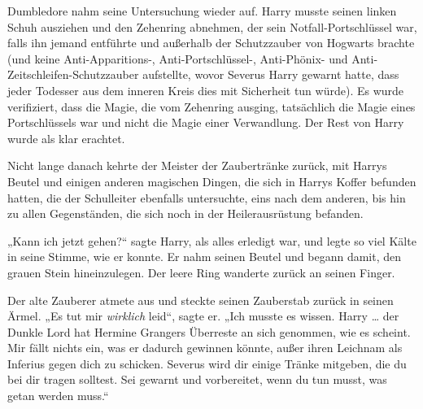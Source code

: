 Dumbledore nahm seine Untersuchung wieder auf. Harry musste seinen linken Schuh ausziehen und den Zehenring abnehmen, der sein Notfall-Portschlüssel war, falls ihn jemand entführte und außerhalb der Schutzzauber von Hogwarts brachte (und keine Anti-Apparitions-, Anti-Portschlüssel-, Anti-Phönix- und Anti-Zeitschleifen-Schutzzauber aufstellte, wovor Severus Harry gewarnt hatte, dass jeder Todesser aus dem inneren Kreis dies mit Sicherheit tun würde). Es wurde verifiziert, dass die Magie, die vom Zehenring ausging, tatsächlich die Magie eines Portschlüssels war und nicht die Magie einer Verwandlung. Der Rest von Harry wurde als klar erachtet.

Nicht lange danach kehrte der Meister der Zaubertränke zurück, mit Harrys Beutel und einigen anderen magischen Dingen, die sich in Harrys Koffer befunden hatten, die der Schulleiter ebenfalls untersuchte, eins nach dem anderen, bis hin zu allen Gegenständen, die sich noch in der Heilerausrüstung befanden.

„Kann ich jetzt gehen?“ sagte Harry, als alles erledigt war, und legte so viel Kälte in seine Stimme, wie er konnte. Er nahm seinen Beutel und begann damit, den grauen Stein hineinzulegen. Der leere Ring wanderte zurück an seinen Finger.

Der alte Zauberer atmete aus und steckte seinen Zauberstab zurück in seinen Ärmel.
„Es tut mir \emph{wirklich} leid“, sagte er.
„Ich musste es wissen. Harry … der Dunkle Lord hat Hermine Grangers Überreste an sich genommen, wie es scheint. Mir fällt nichts ein, was er dadurch gewinnen könnte, außer ihren Leichnam als Inferius gegen dich zu schicken. Severus wird dir einige Tränke mitgeben, die du bei dir tragen solltest. Sei gewarnt und vorbereitet, wenn du tun musst, was getan werden muss.“

